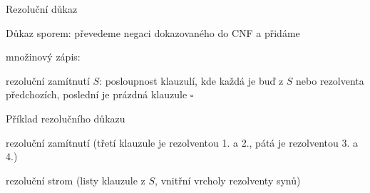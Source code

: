 \documentclass{beamer}
\begin{document}
\begin{frame}{Rezoluční důkaz}

Důkaz sporem: převedeme \alert{negaci} dokazovaného do CNF a přidáme

\vspace{-6pt}

množinový zápis:


\alert{rezoluční zamítnutí $S$}: posloupnost klauzulí, kde každá je buď z $S$ nebo rezolventa předchozích, poslední je prázdná klauzule $\square$


\end{frame}


\begin{frame}{Příklad rezolučního důkazu}

\alert{rezoluční zamítnutí} (třetí klauzule je rezolventou 1. a 2., pátá je rezolventou 3. a 4.)


\alert{rezoluční strom} (listy klauzule z $S$, vnitřní vrcholy rezolventy synů) 
\end{frame}



\end{document}
